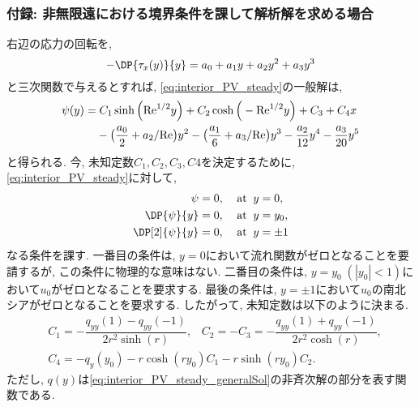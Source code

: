 \newpage
\subsubsection*{付録: 非無限遠における境界条件を課して解析解を求める場合}

右辺の応力の回転を, 
\begin{equation}
   - \DP{\tau_x(y)}{y} = a_0 + a_1 y + a_2 y^2 + a_3 y^3
\end{equation}
と三次関数で与えるとすれば, 
\eqref{eq:interior_PV_steady}の一般解は, 
\begin{equation}
\begin{split}
    \psi(y) =& \; C_1 \sinh \Big( {\rm Re}^{1/2} y \Big) + C_2 \cosh \Big( -{\rm Re}^{1/2} y \Big) 
               + C_3 + C_4 x \\
             & - \big(\dfrac{a_0}{2} + a_2/{\rm Re}\big)y^2 - \big( \dfrac{a_1}{6} + a_3/{\rm Re} \big) y^3
               - \dfrac{a_2}{12}y^4 - \dfrac{a_3}{20} y^5
\end{split}
\label{eq:interior_PV_steady_generalSol}
\end{equation}
と得られる. 
今, 未知定数$C_1, C_2, C_3, C4$を決定するために, 
\eqref{eq:interior_PV_steady}に対して, 
\begin{equation}
\begin{split}
   \psi &= 0, \;\;\;\; {\rm at} \;\; y = 0, \\
   \DP{\psi}{y} &= 0, \;\;\;\; {\rm at} \;\; y = y_0,  \\
   \DP[2]{\psi}{y} &= 0, \;\;\;\; {\rm at} \;\; y = \pm 1
\end{split}
\label{eq:BC_interior_streamFunc_nodim}
\end{equation}
なる条件を課す.  
一番目の条件は, $y=0$において流れ関数がゼロとなることを要請するが,  
この条件に物理的な意味はない. 
二番目の条件は, $y=y_0\;(|y_0| < 1)$において$u_0$がゼロとなることを要求する. 
最後の条件は, $y=\pm 1$において$u_0$の南北シアがゼロとなることを要求する. 
したがって, 未知定数は以下のように決まる. 
\begin{equation}
\begin{split}
  &C_1 = - \dfrac{q_{yy}(1) - q_{yy}(-1)}{2r^2 \sinh(r)}, \;\;\;
   C_2 = - C_3 = - \dfrac{q_{yy}(1) + q_{yy}(-1)}{2r^2 \cosh(r)}, \\
  &C_4 = - q_y(y_0) - r\cosh(ry_0)C_1 - r\sinh(ry_0)C_2. 
\end{split}
\end{equation}
ただし, $q(y)$は\eqref{eq:interior_PV_steady_generalSol}の非斉次解の部分を表す関数である. 

